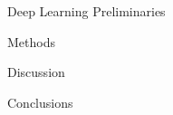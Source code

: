 \documentclass[12pt]{report}
\begin{document}
\newpage
Deep Learning Preliminaries


\newpage
Methods


\newpage
Discussion


\newpage
Conclusions


\newpage


\end{document}

